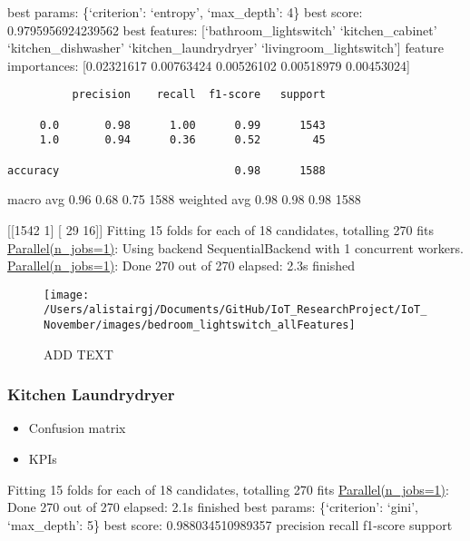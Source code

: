 \documentclass[11pt,]{article}
\providecommand{\tightlist}{%
  \setlength{\itemsep}{0pt}\setlength{\parskip}{0pt}}
\begin{document}
best params: \{`criterion': `entropy', `max\_depth': 4\} best score:
0.9795956924239562 best features: {[}`bathroom\_lightswitch'
`kitchen\_cabinet' `kitchen\_dishwasher' `kitchen\_laundrydryer'
`livingroom\_lightswitch'{]} feature importances: {[}0.02321617
0.00763424 0.00526102 0.00518979 0.00453024{]}

\begin{verbatim}
          precision    recall  f1-score   support

     0.0       0.98      1.00      0.99      1543
     1.0       0.94      0.36      0.52        45

accuracy                           0.98      1588
\end{verbatim}

macro avg 0.96 0.68 0.75 1588 weighted avg 0.98 0.98 0.98 1588

{[}{[}1542 1{]} {[} 29 16{]}{]} Fitting 15 folds for each of 18
candidates, totalling 270 fits
\href{Done\%20270\%20out\%20of\%20270\%20\%7C\%20elapsed:\%202.1s\%20finished}{Parallel(n\_jobs=1)}:
Using backend SequentialBackend with 1 concurrent workers.
\href{Done\%20270\%20out\%20of\%20270\%20\%7C\%20elapsed:\%202.1s\%20finished}{Parallel(n\_jobs=1)}:
Done 270 out of 270 \textbar{} elapsed: 2.3s finished

\begin{figure}[H]

{\centering \texttt{[image: /Users/alistairgj/Documents/GitHub/IoT\_ResearchProject/IoT\_November/images/bedroom\_lightswitch\_allFeatures]} 

}

\caption{ADD TEXT}\label{fig:unnamed-chunk-1}
\end{figure}

\pagebreak

\hypertarget{kitchen-laundrydryer}{%
\subsubsection{Kitchen Laundrydryer}\label{kitchen-laundrydryer}}

\begin{itemize}
\tightlist
\item
  Confusion matrix
\item
  KPIs
\end{itemize}

Fitting 15 folds for each of 18 candidates, totalling 270 fits
\href{Done\%20270\%20out\%20of\%20270\%20\%7C\%20elapsed:\%202.1s\%20finished}{Parallel(n\_jobs=1)}:
Done 270 out of 270 \textbar{} elapsed: 2.1s finished best params:
\{`criterion': `gini', `max\_depth': 5\} best score: 0.988034510989357
precision recall f1-score support
\end{document}
